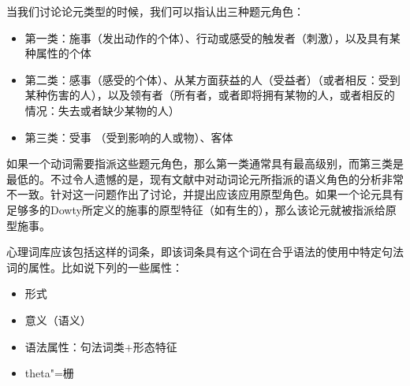当我们讨论论元类型的时候，我们可以指认出三种题元角色：
\begin{itemize}
\item 第一类：施事（发出动作的个体）、行动或感受的触发者（刺激），以及具有某种属性的个体
\item 第二类：感事（感受的个体）、从某方面获益的人（受益者）（或者相反：受到某种伤害的人），以及领有者（所有者，或者即将拥有某物的人，或者相反的情况：失去或者缺少某物的人）
\item 第三类：受事 （受到影响的人或物）、客体
\end{itemize}
如果一个动词需要指派这些题元角色，那么第一类通常具有最高级别，而第三类是最低的。不过令人遗憾的是，现有文献中对动词论元所指派的语义角色的分析非常不一致。\citet{Dowty91a}针对这一问题作出了讨论，并提出应该应用原型角色。如果一个论元具有足够多的Dowty所定义的施事的原型特征（如有生的），那么该论元就被指派给原型施事。
\nocite{Gruber65a-u,Fillmore68,Fillmore71a-u,Jackendoff72a-u,Dowty91a}

心理词库应该包括这样的词条，即该词条具有这个词在合乎语法的使用中特定句法词的属性。比如说下列的一些属性：
\begin{itemize}
\item 形式
\item 意义（语义）
\item 语法属性：句法词类$+$形态特征  
\item theta"=栅
\end{itemize}

